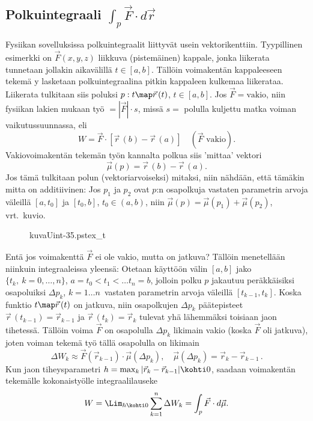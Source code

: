 \subsection{Polkuintegraali $\int_p \vec F \cdot d\vec r$}

Fysiikan sovelluksissa polkuintegraalit liittyvät usein vektorikenttiin. Tyypillinen esimerkki
on  $\vec F(x,y,z)$ liikkuva (pistemäinen) kappale, jonka liikerata
tunnetaan jollakin aikavälillä $t\in [a,b]$. Tällöin voimakentän kappaleeseen tekemä
y lasketaan polkuintegraalina pitkin kappaleen kulkemaa liikerataa. Liikerata
tulkitaan siis poluksi $p:t \map \vec r\,(t)$, $t\in [a,b]$. Jos $\vec F=\text{vakio}$, niin
fysiikan lakien mukaan työ $=|\vec F| \cdot s$, missä $s=$ polulla kuljettu matka voiman
vaikutussuunnassa, eli
\[
W=\vec F\cdot[\vec r\,(b)-\vec r\,(a)]\quad (\vec F\text{ vakio}).
\]
Vakiovoimakentän tekemän työn kannalta polkua siis 'mittaa' vektori
\[
\vec\mu(p)=\vec r\,(b)-\vec r\,(a).
\]
Jos tämä tulkitaan polun (vektoriarvoiseksi) mitaksi, niin nähdään, että tämäkin mitta on
additiivinen: Jos $p_1$ ja $p_2$ ovat $p$:n osapolkuja vastaten parametrin arvoja väleillä
$[a,t_0]$ ja $[t_0,b]$, $t_0\in (a,b)$, niin $\vec \mu(p)=\vec \mu(p_1)+\vec\mu(p_2)$,
vrt.\ kuvio.
\begin{figure}[H]
\begin{center}
{kuvaUint-35.pstex_t}
\end{center}
\end{figure}
Entä jos voimakenttä $\vec F$ ei ole vakio, mutta on jatkuva? Tällöin menetellään niinkuin
integraaleissa yleensä: Otetaan käyttöön välin $[a,b]$ jako $\{t_k, \ k=0,\ldots,n\}$,
$a=t_0<t_1<\ldots t_n=b$, jolloin polku $p$ jakautuu peräkkäisiksi osapoluiksi $\Delta p_k$,
$k=1\ldots n\,$ vastaten parametrin arvoja väleillä $[t_{k-1},t_k]$. Koska funktio
$t \map \vec r\,(t)$ on jatkuva, niin osapolkujen $\Delta p_k$ päätepisteet 
$\vec r\,(t_{k-1})=\vec r_{k-1}$ ja $\vec r\,(t_k)=\vec r_k$ tulevat yhä lähemmäksi toisiaan
jaon tihetessä. Tällöin voima $\vec F$ on osapolulla $\Delta p_k$ likimain vakio 
(koska $\vec F$ oli jatkuva), joten voiman tekemä työ tällä osapolulla on likimain
\[
\Delta W_k\approx\vec F(\vec r_{k-1})\cdot\vec\mu(\Delta p_k),\quad 
\vec\mu(\Delta p_k)=\vec r_k-\vec r_{k-1}\,.
\]
Kun jaon tiheysparametri $h=\max_k|\vec r_k-\vec r_{k-1}|\kohti 0$, saadaan voimakentän
tekemälle kokonaistyölle integraalilauseke
\[
W=\Lim_{h\kohti 0}\sum_{k=1}^n\Delta W_k=\int_p \vec F\cdot d\vec\mu.
\]

